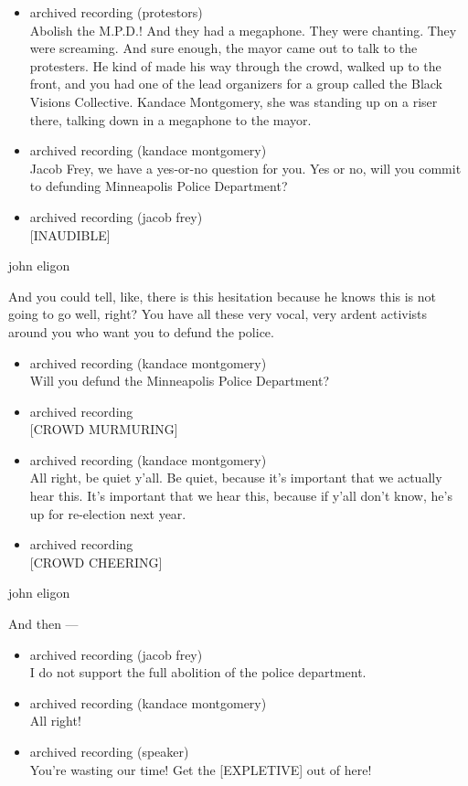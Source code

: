 \begin{itemize}
\item
  archived recording (protestors)\\
  Abolish the M.P.D.! And they had a megaphone. They were chanting. They
  were screaming. And sure enough, the mayor came out to talk to the
  protesters. He kind of made his way through the crowd, walked up to
  the front, and you had one of the lead organizers for a group called
  the Black Visions Collective. Kandace Montgomery, she was standing up
  on a riser there, talking down in a megaphone to the mayor.
\item
  archived recording (kandace montgomery)\\
  Jacob Frey, we have a yes-or-no question for you. Yes or no, will you
  commit to defunding Minneapolis Police Department?
\item
  archived recording (jacob frey)\\
  {[}INAUDIBLE{]}
\end{itemize}

john eligon

And you could tell, like, there is this hesitation because he knows this
is not going to go well, right? You have all these very vocal, very
ardent activists around you who want you to defund the police.

\begin{itemize}
\item
  archived recording (kandace montgomery)\\
  Will you defund the Minneapolis Police Department?
\item
  archived recording\\
  {[}CROWD MURMURING{]}
\item
  archived recording (kandace montgomery)\\
  All right, be quiet y'all. Be quiet, because it's important that we
  actually hear this. It's important that we hear this, because if y'all
  don't know, he's up for re-election next year.
\item
  archived recording\\
  {[}CROWD CHEERING{]}
\end{itemize}

john eligon

And then ---

\begin{itemize}
\item
  archived recording (jacob frey)\\
  I do not support the full abolition of the police department.
\item
  archived recording (kandace montgomery)\\
  All right!
\item
  archived recording (speaker)\\
  You're wasting our time! Get the {[}EXPLETIVE{]} out of here!
\end{itemize}

